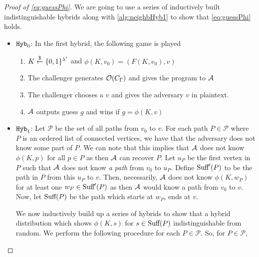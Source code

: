 \begin{proof}[Proof of \cref{eq:guessPhi}]
	We are going to use a series of inductively built indistinguishable hybrids along with \cref{alg:neighbHyb1}
	to show that \cref{eq:guessPhi} holds.
	\begin{itemize}
		\item $\texttt{Hyb}_0$: In the first hybrid, the following game is played
			\begin{enumerate}
				\item $K \overset{\$}{\gets} \{0,1\}^{\lambda'}$ and $\phi(K, v_0) = (F(K, v_0), v)$
				\item The challenger generates $\mathcal{O}(C_\Gamma)$ and gives the program to $\mathcal{A}$
				\item The challenger chooses a $v$ and gives the adversary $v$ in plaintext.
				\item $\mathcal{A}$ outputs guess $g$ and wins if $g = \phi(K, v)$
			\end{enumerate}
		
		\item $\texttt{Hyb}_1$: Let $\mathcal{P}$ be the set of all paths from $v_0$ to $v$. For each path $P \in \mathcal{P}$
		where $P$ is an ordered list of connected vertices, we have that the adversary does not know
		some part of $P$.
		We can note that this implies that $\mathcal{A}$ does not know $\phi(K, p)$ for all $p \in P$ as then
		$\mathcal{A}$ can recover $P$. Let $u_P$ be the first vertex in $P$ such that $\mathcal{A}$ does not know 
		\emph{a path} from $v_0$ to $u_P$. Define $\text{Suff}'(P)$ to be the path in $P$ from this $u_P$ to $v$.
		Then, necessarily, $\mathcal{A}$ does not know $\phi(K, w_P)$ for at least one $w_P \in \text{Suff}'(P)$
		as then $\mathcal{A}$ would know a path from $v_0$ to $v$. Now, let $\text{Suff}(P)$ be the path which starts at $w_P$, ends at $v$.

		We now inductively build up a series of hybrids to show that a hybrid distribution
		which shows $\phi(K, s)$ for $s \in \text{Suff}(P)$ indistinguishable from random.
		We perform the following procedure for each $P \in \mathcal{P}$. So, for $P \in \mathcal{P}$,
		

\end{itemize}
\end{proof}
